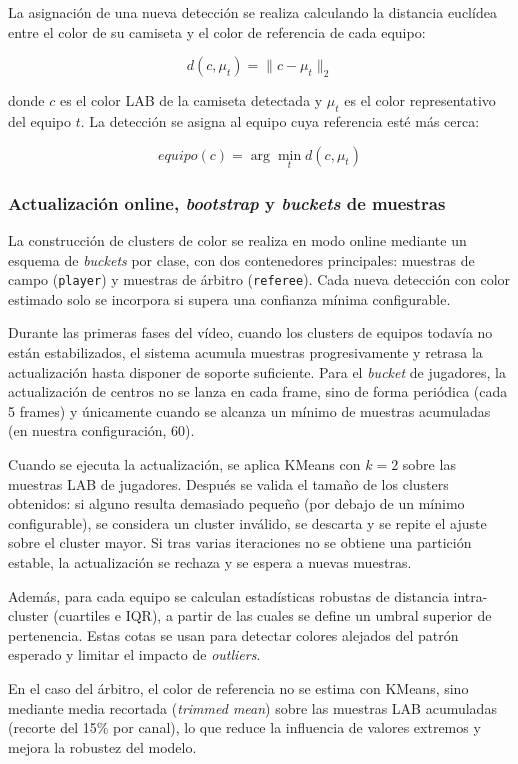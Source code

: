 La asignación de una nueva detección se realiza calculando la distancia euclídea entre el color de su camiseta y el color de referencia de cada equipo:

\[
d(c, \mu_t) = \|c - \mu_t\|_2
\]

donde $c$ es el color LAB de la camiseta detectada y $\mu_t$ es el color representativo del equipo $t$. La detección se asigna al equipo cuya referencia esté más cerca:

\[
equipo(c) = \arg\min_t d(c, \mu_t)
\]


\subsubsection{Actualización online, \textit{bootstrap} y \textit{buckets} de muestras}

La construcción de clusters de color se realiza en modo online mediante un esquema de \textit{buckets} por clase, con dos contenedores principales: muestras de campo (\texttt{player}) y muestras de árbitro (\texttt{referee}). Cada nueva detección con color estimado solo se incorpora si supera una confianza mínima configurable.

Durante las primeras fases del vídeo, cuando los clusters de equipos todavía no están estabilizados, el sistema acumula muestras progresivamente y retrasa la actualización hasta disponer de soporte suficiente. Para el \textit{bucket} de jugadores, la actualización de centros no se lanza en cada frame, sino de forma periódica (cada 5 frames) y únicamente cuando se alcanza un mínimo de muestras acumuladas (en nuestra configuración, 60).

Cuando se ejecuta la actualización, se aplica KMeans con $k=2$ sobre las muestras LAB de jugadores. Después se valida el tamaño de los clusters obtenidos: si alguno resulta demasiado pequeño (por debajo de un mínimo configurable), se considera un cluster inválido, se descarta y se repite el ajuste sobre el cluster mayor. Si tras varias iteraciones no se obtiene una partición estable, la actualización se rechaza y se espera a nuevas muestras.

Además, para cada equipo se calculan estadísticas robustas de distancia intra-cluster (cuartiles e IQR), a partir de las cuales se define un umbral superior de pertenencia. Estas cotas se usan para detectar colores alejados del patrón esperado y limitar el impacto de \textit{outliers}.

En el caso del árbitro, el color de referencia no se estima con KMeans, sino mediante media recortada (\textit{trimmed mean}) sobre las muestras LAB acumuladas (recorte del 15\% por canal), lo que reduce la influencia de valores extremos y mejora la robustez del modelo.

